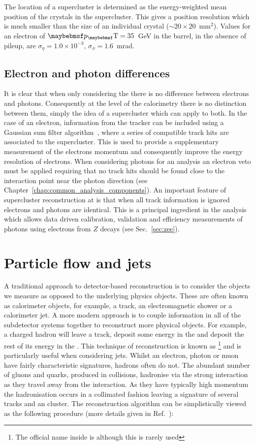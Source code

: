 The location of a supercluster is determined as the energy-weighted mean position of the crystals in the supercluster. This gives a position resolution which is much smaller than the size of an individual crystal ($\sim20\times20$~mm$^{2}$). Values for an electron of $\pT=35$~GeV in the \ECAL barrel, in the absence of pileup, are $\sigma_{\eta}=1.0\times10^{-3}$, $\sigma_{\phi}=1.6$~mrad.

\subsection{Electron and photon differences}

It is clear that when only considering the \ECAL there is no difference between electrons and photons. Consequently at the level of the calorimetry there is no distinction between them, simply the idea of a supercluster which can apply to both. In the case of an electron, information from the tracker can be included using a Gaussian sum filter algorithm~\cite{tracker_electron_reco}, where a series of compatible track hits are associated to the supercluster. This is used to provide a supplementary measurement of the electrons momentum and consequently improve the energy resolution of electrons. When considering photons for an analysis an electron veto must be applied requiring that no track hits should be found close to the interaction point near the photon direction (see Chapter~\ref{chap:common_analysis_components}). An important feature of supercluster reconstruction at \CMS is that when all track information is ignored electrons and photons are identical. This is a principal ingredient in the \Hgg analysis which allows data driven calibration, validation and efficiency measurements of photons using electrons from $Z$ decays (see Sec.~\ref{sec:zee}).

\section{Particle flow and jets}
\label{sec:pflow_jets}
A traditional approach to detector-based reconstruction is to consider the objects we measure as opposed to the underlying physics objects. These are often known as calorimeter objects, for example, a track, an electromagnetic shower or a calorimeter jet. A more modern approach is to couple information in all of the subdetector systems together to reconstruct more physical objects. For example, a charged hadron will leave a track, deposit some energy in the \ECAL and deposit the rest of its energy in the \HCAL. This technique of reconstruction is known as \PF\footnote{The official name inside \CMS is \GED although this is rarely used} and is particularly useful when considering jets. Whilst an electron, photon or muon have fairly characteristic signatures, hadrons often do not. The abundant number of gluons and quarks, produced in \LHC collisions, hadronise via the strong interaction as they travel away from the interaction. As they have typically high momentum the hadronisation occurs in a collimated fashion leaving a signature of several tracks and an \HCAL cluster. The \PF reconstruction algorithm can be simplistically viewed as the following procedure (more details given in Ref.~\cite{cms_pf_algo}):

